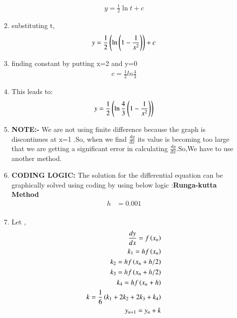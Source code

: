 \documentclass[journal]{IEEEtran}
\begin{document}
\begin{enumerate}
\begin{enumerate}
\begin{align}
    y = \frac{1}{2}\ln{t} + c
    \end{align}
    \item substituting t,
    \begin{align}
    y = \frac{1}{2}\left(\ln{\ensuremath{\left(1-\frac{1}{x^2}\right)}}\right) + c
    \end{align} 
    \item finding constant by putting x=2 and y=0
    \begin{align}
    c = \frac{1}{2}ln{\frac{4}{3}}
    \end{align} 
    \item This leads to:
    \begin{align}
    y = \frac{1}{2}\left(\ln{\frac{4}{3}\ensuremath{\left(1-\frac{1}{x^2}\right)}}\right)
    \end{align}
    \item \textbf{NOTE:-} We are not using finite difference because the graph is discontinues at x=1 .So, when we find $\frac{dy}{dx}$ its value is becoming too large that we are getting a significant error in calculating $\frac{dy}{dx}$.So,We have to use another method.
    \item \textbf{CODING LOGIC:} The solution for the differential equation can be graphically solved using coding by using below logic :\textbf{Runga-kutta Method}
\begin{align} 
	h&=0.001 \\
\end{align}
\item Let ,
\begin{align} 
	\frac{dy}{dx} = f\left(x_n\right) \\
	k_1 = hf\left(x_n\right)\\
	k_2 = hf\left(x_n + h/2\right)\\
	k_3 = hf\left(x_n + h/2\right)\\
	k_4 = hf\left(x_n + h\right)\\
	k = \frac{1}{6}\left(k_1 + 2k_2 + 2k_3+k_4\right)\\
	y_{n+1} = y_n + k
\end{align}
\end{enumerate}

\end{enumerate}
\end{document}
